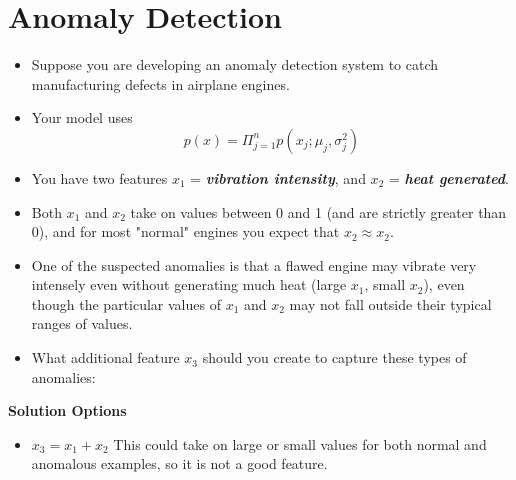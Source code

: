 \documentclass[]{article}
\begin{document}
\section*{Anomaly Detection}
\begin{itemize}
\item Suppose you are developing an anomaly detection system to catch manufacturing defects in airplane engines. 
\item Your model uses
{ 
\Large
\[p(x)= \Pi ^{n}_{j=1} p(x_j;\mu_j,\sigma^2_j)\] 
}
\item You have two features $x_1$ = \textit{\textbf{vibration intensity}}, and $x_2$ = \textit{\textbf{heat generated}}. 
\item Both $x_1$ and $x_2$ take on values between 0 and 1 (and are strictly greater than 0), and for most "normal" engines you expect that $x_2 \approx x_2$. 
\item One of the suspected anomalies is that a flawed engine may vibrate very intensely even without generating much heat (large $x_1$, small $x_2$), 
even though the particular values of $x_1$ and $x_2$ may not fall outside their typical ranges of values. 
\item What additional feature $x_3$ should you create to capture these types of anomalies:
\end{itemize}
\textbf{Solution Options}
\begin{itemize}
\item $x_3=x_1+x_2$	This could take on large or small values for both normal and anomalous examples, so it is not a good feature.
\end{itemize}
\end{document}
